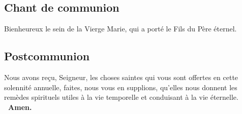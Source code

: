 \begin{multicols}{2}
\subsection*{Chant de communion}
Bienheureux le sein de la Vierge Marie, qui a porté le Fils du Père éternel.

\subsection*{Postcommunion}
{Nous avons reçu, Seigneur, les choses saintes qui vous sont offertes en cette solennité annuelle, faites, nous vous en supplions, qu’elles nous donnent les remèdes spirituels utiles à la vie temporelle et conduisant à la vie éternelle.}
\textbf{ \rb\ Amen.}

\end{multicols}